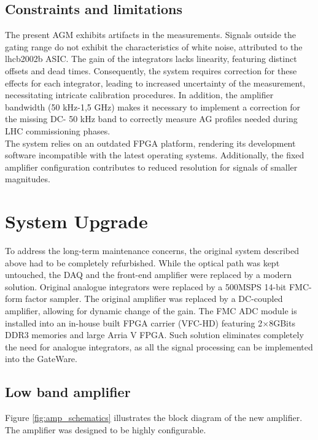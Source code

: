 \subsection{Constraints and limitations}
The present AGM exhibits artifacts in the measurements. Signals outside the gating range do not exhibit the characteristics of white noise, attributed to the lhcb2002b ASIC. The gain of the integrators lacks linearity, featuring distinct offsets and dead times. Consequently, the system requires correction for these effects for each integrator, leading to increased uncertainty of the measurement, necessitating intricate calibration procedures. In addition, the amplifier bandwidth (50 kHz-1,5 GHz) makes it necessary to implement a correction for the missing DC- 50 kHz band to correctly measure AG profiles needed during LHC commissioning phases.\\
The system relies on an outdated FPGA platform, rendering its development
software incompatible with the latest operating systems. Additionally, the fixed amplifier configuration contributes to reduced resolution for signals of smaller magnitudes.

\section{System Upgrade}
To address the long-term maintenance concerns, the original system described above had to be completely refurbished. While the optical path was kept untouched, the DAQ and the front-end amplifier were replaced by a modern solution. Original analogue integrators were replaced by a 500MSPS 14-bit FMC-form factor sampler. The original amplifier was replaced by a DC-coupled amplifier, allowing for dynamic change of the gain. The FMC ADC module is installed into an in-house built FPGA carrier (VFC-HD) featuring 2$\times 8$GBits DDR3 memories and large Arria V FPGA.  Such solution eliminates completely the need for analogue integrators, as all the signal processing can be implemented into the GateWare.  

\subsection{Low band amplifier}

Figure \ref{fig:amp_schematics} illustrates the block diagram of the new amplifier. The amplifier was designed to be highly configurable.

